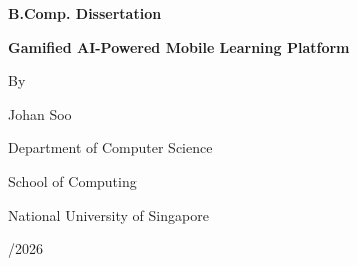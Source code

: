 \documentclass[
  12pt,
  a4paper,
]{report}
\author{}
\date{}
\begin{document}
\newcommand{\reporttitletext}{Gamified AI-Powered Mobile Learning Platform}
\newcommand{\reportauthorname}{Johan Soo}
\newcommand{\reportdepartment}{Department of Computer Science}
\newcommand{\reportschool}{School of Computing}
\newcommand{\reportuniversity}{National University of Singapore}
\newcommand{\reportacademicyear}{2025/2026}
\newcommand{\reportprojectnumber}{H416100}
\newcommand{\reportadvisorname}{Associate Professor Anandha Gopalan}

\begin{titlepage}
\thispagestyle{empty}
\begin{center}
\vspace*{2.0cm}
{\fontsize{14}{16}\selectfont\bfseries B.Comp. Dissertation\par}
\vspace{1.0cm}
{\fontsize{18}{22}\selectfont\bfseries \reporttitletext\par}
\vspace{0.9cm}
{\fontsize{12}{14}\selectfont By\par}
\vspace{0.4cm}
{\fontsize{12}{14}\selectfont \reportauthorname\par}
\vfill
{\fontsize{12}{14}\selectfont \reportdepartment\par}
{\fontsize{12}{14}\selectfont \reportschool\par}
{\fontsize{12}{14}\selectfont \reportuniversity\par}
\vspace{0.6cm}
{\fontsize{12}{14}\selectfont \reportacademicyear\par}
\end{center}
\end{titlepage}
\end{document}
